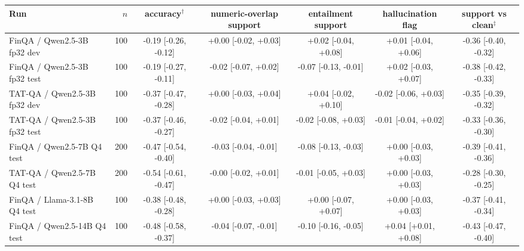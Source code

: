 \begin{tabular}{@{}l r ccccc@{}}
\toprule
Run & $n$ & accuracy$^\dagger$ & numeric-overlap support & entailment support & hallucination flag & support vs clean$^\ddagger$ \\
\midrule
FinQA / Qwen2.5-3B fp32 dev & 100 & -0.19 \small[-0.26, -0.12] & +0.00 \small[-0.02, +0.03] & +0.02 \small[-0.04, +0.08] & +0.01 \small[-0.04, +0.06] & -0.36 \small[-0.40, -0.32] \\
FinQA / Qwen2.5-3B fp32 test & 100 & -0.19 \small[-0.27, -0.11] & -0.02 \small[-0.07, +0.02] & -0.07 \small[-0.13, -0.01] & +0.02 \small[-0.03, +0.07] & -0.38 \small[-0.42, -0.33] \\
TAT-QA / Qwen2.5-3B fp32 dev & 100 & -0.37 \small[-0.47, -0.28] & +0.00 \small[-0.03, +0.04] & +0.04 \small[-0.02, +0.10] & -0.02 \small[-0.06, +0.03] & -0.35 \small[-0.39, -0.32] \\
TAT-QA / Qwen2.5-3B fp32 test & 100 & -0.37 \small[-0.46, -0.27] & -0.02 \small[-0.04, +0.01] & -0.02 \small[-0.08, +0.03] & -0.01 \small[-0.04, +0.02] & -0.33 \small[-0.36, -0.30] \\
FinQA / Qwen2.5-7B Q4 test & 200 & -0.47 \small[-0.54, -0.40] & -0.03 \small[-0.04, -0.01] & -0.08 \small[-0.13, -0.03] & +0.00 \small[-0.03, +0.03] & -0.39 \small[-0.41, -0.36] \\
TAT-QA / Qwen2.5-7B Q4 test & 200 & -0.54 \small[-0.61, -0.47] & -0.00 \small[-0.02, +0.01] & -0.01 \small[-0.05, +0.03] & +0.00 \small[-0.03, +0.03] & -0.28 \small[-0.30, -0.25] \\
FinQA / Llama-3.1-8B Q4 test & 100 & -0.38 \small[-0.48, -0.28] & +0.00 \small[-0.03, +0.03] & +0.00 \small[-0.07, +0.07] & +0.00 \small[-0.03, +0.03] & -0.37 \small[-0.41, -0.34] \\
FinQA / Qwen2.5-14B Q4 test & 100 & -0.48 \small[-0.58, -0.37] & -0.04 \small[-0.07, -0.01] & -0.10 \small[-0.16, -0.05] & +0.04 \small[+0.01, +0.08] & -0.43 \small[-0.47, -0.40] \\
\bottomrule
\end{tabular}
